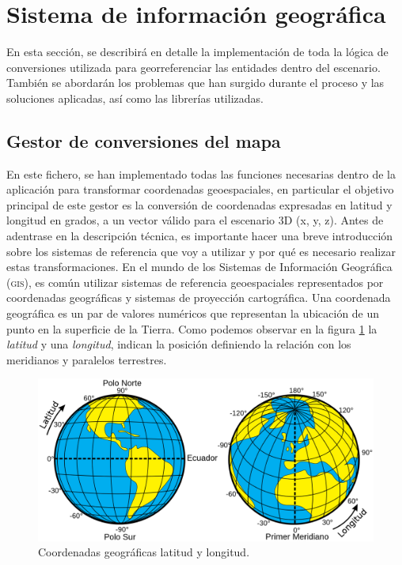 \documentclass[a4paper, 11pt]{book}
\begin{document}
\clearpage
\section{Sistema de información geográfica}
\label{sec:gis}
En esta sección, se describirá en detalle la implementación de toda la lógica de conversiones utilizada para georreferenciar las entidades dentro del escenario. También se abordarán los problemas que han surgido durante el proceso y las soluciones aplicadas, así como las librerías utilizadas.
\subsection{Gestor de conversiones del mapa}
\label{subsec:mapConversion}
En este fichero, se han implementado todas las funciones necesarias dentro de la aplicación para transformar coordenadas geoespaciales, en particular el objetivo principal de este gestor es la conversión de coordenadas expresadas en latitud y longitud en grados, a un vector válido para el escenario \gls{3D} (x, y, z).
Antes de adentrase en la descripción técnica, es importante hacer una breve introducción sobre los sistemas de referencia que voy a utilizar y por qué es necesario realizar estas transformaciones.
En el mundo de los Sistemas de Información Geográfica (\textsc{\gls{gis}}), es común utilizar sistemas de referencia geoespaciales representados por coordenadas geográficas y sistemas de proyección cartográfica.
Una coordenada geográfica es un par de valores numéricos que representan la ubicación de un punto en la superficie de la Tierra. Como podemos observar en la figura \ref{fig:latlong} la \emph{latitud} y una \emph{longitud}, indican la posición definiendo la relación con los meridianos y paralelos terrestres.

\begin{figure}[h]
	\centering
	\includegraphics[width=12cm, keepaspectratio]{img/Latitud_y_Longitud_en_la_Tierra.svg.png}
	\caption{Coordenadas geográficas latitud y longitud.}
	\label{fig:latlong}
\end{figure}
\end{document}
